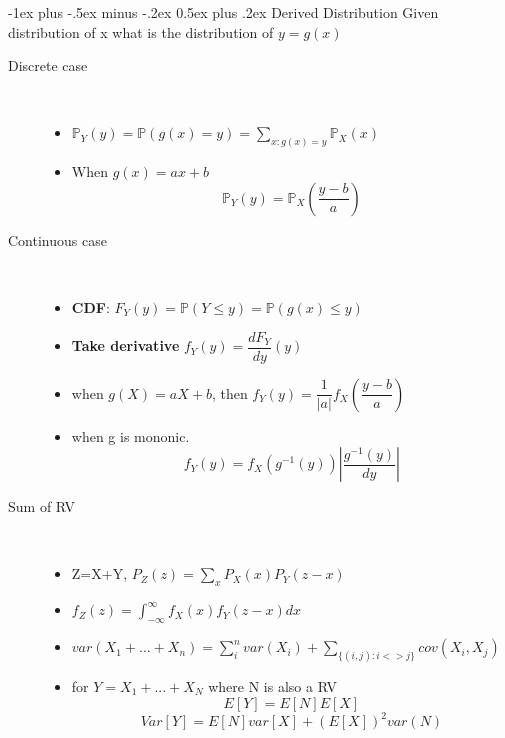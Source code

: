 \documentclass[a4paper, 10pt,landscape]{article}
\makeatletter
\renewcommand{\section}{\@startsection{section}{1}{0mm}%
                                {-1ex plus -.5ex minus -.2ex}%
                                {0.5ex plus .2ex}%
                                {\normalfont\large\bfseries}}
\makeatother
\begin{document}
\begin{multicols*}{4}
\section{Derived Distribution}
Given distribution of x what is the distribution of $y = g(x)$
\begin{description}
	\item[Discrete case]~
		\begin{itemize}
			\item $\mathbb{P}_Y(y) = \mathbb{P}(g(x) = y) = \sum_{x: g(x)=y}\mathbb{P}_X(x)$
			\item When $g(x) = ax + b$  $$\mathbb{P}_Y(y)=\mathbb{P}_X(\dfrac{y-b}{a})$$
		\end{itemize}
	\item[Continuous case]~
		\begin{itemize}
			\item {\bf CDF}: $F_Y(y)=\mathbb{P}(Y \leq y) = \mathbb{P}(g(x) \leq y)$
			\item {\bf Take derivative} $f_Y(y) = \dfrac{dF_Y}{dy}(y)$
			\item when $g(X) = aX +b$, then $f_Y(y) = \dfrac{1}{|a|}f_X(\dfrac{y-b}{a})$
			\item when g is mononic. $$f_Y(y) = f_X(g^{-1}(y)) |\dfrac{g^{-1}(y)}{dy}|$$
		\end{itemize}
	\item[Sum of RV]~
		\begin{itemize}
			\item Z=X+Y, $P_Z(z) = \sum_x P_X(x)P_Y(z-x)$
			\item $f_Z(z) = \int_{-\infty}^{\infty}f_X(x)f_Y(z-x)dx$
			\item $var(X_1+...+X_n) = \sum_i^n var(X_i) + \sum_{\{(i,j):i<>j\}}cov(X_i, X_j)$
			\item for $Y = X_1 + ... + X_N$ where N is also a RV
				$$E[Y] = E[N]E[X]$$
				$$Var[Y] = E[N]var[X] + (E[X])^2var(N)$$
		\end{itemize}
\end{description}


\end{multicols*}
\end{document}
